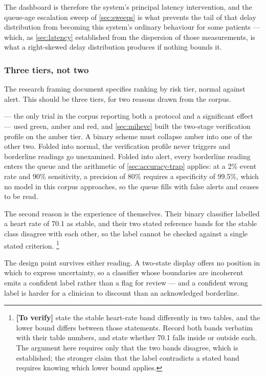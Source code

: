 \documentclass[12pt,a4paper,oneside]{report}
\newcommand{\verify}[1]{\footnote{\textbf{[To verify]} #1}}
\begin{document}
The dashboard is therefore the system's principal latency intervention, and the queue-age escalation sweep of \cref{sec:sweeps} is what prevents the tail of that delay distribution from becoming this system's ordinary behaviour for some patients --- which, as \cref{sec:latency} established from the dispersion of those measurements, is what a right-skewed delay distribution produces if nothing bounds it.

\subsubsection{Three tiers, not two}\label{sec:three-tiers}

The research framing document specifies ranking by risk tier, normal against alert. This should be three tiers, for two reasons drawn from the corpus.

\Textcite{mihevc2025} --- the only trial in the corpus reporting both a protocol and a significant effect --- used green, amber and red, and \cref{sec:mihevc} built the two-stage verification profile on the amber tier. A binary scheme must collapse amber into one of the other two. Folded into normal, the verification profile never triggers and borderline readings go unexamined. Folded into alert, every borderline reading enters the queue and the arithmetic of \cref{sec:accuracy-trap} applies: at a 2\% event rate and 90\% sensitivity, a precision of 80\% requires a specificity of 99.5\%, which no model in this corpus approaches, so the queue fills with false alerts and ceases to be read.

The second reason is the experience of \textcite{efendi2025} themselves. Their binary classifier labelled a heart rate of 70.1 as stable, and their two stated reference bands for the stable class disagree with each other, so the label cannot be checked against a single stated criterion.%
\verify{\Textcite{efendi2025} state the stable heart-rate band differently in two tables, and the lower bound differs between those statements. Record both bands verbatim with their table numbers, and state whether 70.1 falls inside or outside each. The argument here requires only that the two bands disagree, which is established; the stronger claim that the label contradicts a stated band requires knowing which lower bound applies.}

The design point survives either reading. A two-state display offers no position in which to express uncertainty, so a classifier whose boundaries are incoherent emits a confident label rather than a flag for review --- and a confident wrong label is harder for a clinician to discount than an acknowledged borderline.
\end{document}
